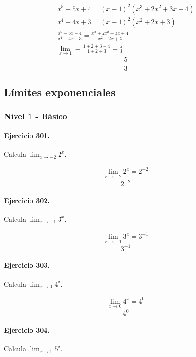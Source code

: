 \documentclass[11pt,a4paper]{article}
\begin{document}
\[
\begin{aligned}
x^5-5x+4=(x-1)^2(x^3+2x^2+3x+4)\\
x^4-4x+3=(x-1)^2(x^2+2x+3)\\
\frac{x^5-5x+4}{x^4-4x+3}=\frac{x^3+2x^2+3x+4}{x^2+2x+3}\\
\lim_{x\to1}=\frac{1+2+3+4}{1+2+3}=\frac{5}{3}
\end{aligned}
\]
\[\boxed{\frac{5}{3}}\]


\newpage

\subsection*{Límites exponenciales}


\subsubsection*{Nivel 1 - Básico}

\paragraph{Ejercicio 301.} Calcula $\displaystyle\lim_{x\to -2}2^x$.

\[
\begin{aligned}
\lim_{x\to -2}2^x=2^{-2}
\end{aligned}
\]
\[\boxed{2^{-2}}\]


\paragraph{Ejercicio 302.} Calcula $\displaystyle\lim_{x\to -1}3^x$.

\[
\begin{aligned}
\lim_{x\to -1}3^x=3^{-1}
\end{aligned}
\]
\[\boxed{3^{-1}}\]


\paragraph{Ejercicio 303.} Calcula $\displaystyle\lim_{x\to 0}4^x$.

\[
\begin{aligned}
\lim_{x\to 0}4^x=4^{0}
\end{aligned}
\]
\[\boxed{4^{0}}\]


\paragraph{Ejercicio 304.} Calcula $\displaystyle\lim_{x\to 1}5^x$.
\end{document}
